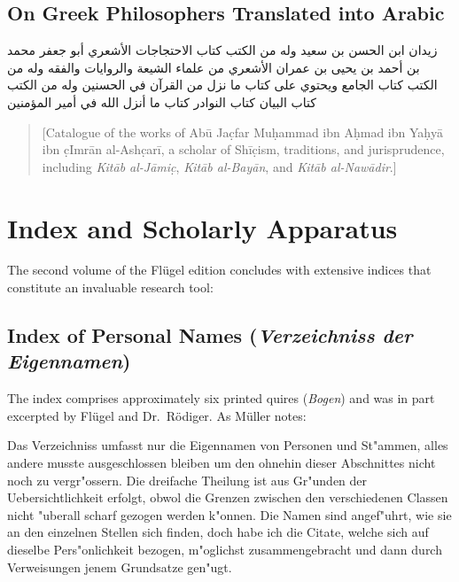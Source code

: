 \documentclass[11pt,a4paper]{article}
\newcommand{\ar}[1]{{\arabicfont\beginR #1\endR}}
\newenvironment{german}{\germanfont}{}
\newenvironment{editorialnote}{%
  \begin{quote}
  \small\itshape\color{notecolor}
}{%
  \end{quote}
}
\newenvironment{arabicblock}{%
  \par\vspace{0.5em}%
  \begin{center}%
  \begin{minipage}{0.9\textwidth}%
  \setlength{\parskip}{0pt}%
  \setlength{\parindent}{0pt}%
}{%
  \end{minipage}%
  \end{center}%
  \vspace{0.5em}%
}
\begin{document}
\subsection{On Greek Philosophers Translated into Arabic}

\begin{arabicblock}
\ar{زيدان}
\ar{ابن الحسن بن سعيد وله من الكتب كتاب الاحتجاجات}
\ar{الأشعري}
\ar{أبو جعفر محمد بن أحمد بن يحيى بن عمران الأشعري من علماء}
\ar{الشيعة والروايات والفقه وله من الكتب كتاب الجامع ويحتوي على}
\ar{كتاب ما نزل من القرآن في الحسنين وله من الكتب كتاب البيان}
\ar{كتاب النوادر كتاب ما أنزل الله في أمير المؤمنين}
\end{arabicblock}

\begin{editorialnote}
[Catalogue of the works of Ab\=u Ja\d{c}far Mu\d{h}ammad ibn A\d{h}mad ibn Ya\d{h}y\=a
ibn \d{c}Imr\=an al-Ash\d{c}ar\=i, a scholar of Sh\=i\d{c}ism, traditions, and
jurisprudence, including \textit{Kit\=ab al-J\=ami\d{c}}, \textit{Kit\=ab al-Bay\=an},
and \textit{Kit\=ab al-Naw\=adir}.]
\end{editorialnote}

\newpage

\section{Index and Scholarly Apparatus}

The second volume of the Fl\"ugel edition concludes with extensive
indices that constitute an invaluable research tool:

\subsection{Index of Personal Names (\textit{Verzeichniss der Eigennamen})}

The index comprises approximately six printed quires (\textit{Bogen})
and was in part excerpted by Fl\"ugel and Dr.~R\"odiger. As M\"uller notes:

\begin{german}
Das Verzeichniss umfasst nur die Eigennamen von Personen und
St"ammen, alles andere musste ausgeschlossen bleiben um den ohnehin
dieser Abschnittes nicht noch zu
vergr"ossern. Die dreifache Theilung ist aus Gr"unden der
Uebersichtlichkeit erfolgt, obwol die Grenzen zwischen den
verschiedenen Classen nicht "uberall scharf gezogen werden
k"onnen. Die Namen sind angef"uhrt, wie sie an den einzelnen
Stellen sich finden, doch habe ich die Citate, welche sich auf
dieselbe Pers"onlichkeit bezogen, m"oglichst zusammengebracht und
dann durch Verweisungen jenem Grundsatze gen"ugt.
\end{german}
\end{document}
